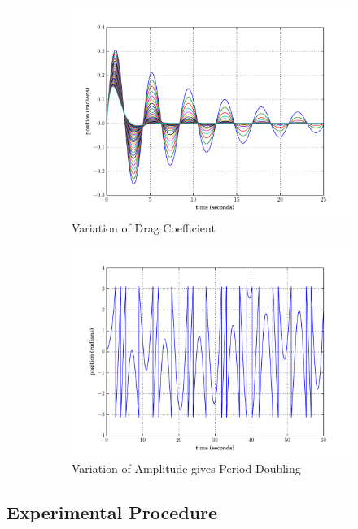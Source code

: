 \begin{figure}[!t]
	\captionsetup{width=0.8\textwidth}
	\begin{subfigure}[t]{.49\textwidth}
		\centering
		\includegraphics[width=\textwidth]{figures/plot02.pdf}
		\caption{Variation of Drag Coefficient}
		\label{fig:01A}
	\end{subfigure}
	\begin{subfigure}[t]{0.49\textwidth}
		\centering
		\includegraphics[width=\textwidth]{figures/plot03.pdf}
		\caption{Variation of Amplitude gives Period Doubling}
		\label{fig:02A}
	\end{subfigure}
	\caption{\blindtext}
	\label{fig:contour}
\end{figure}

\subsection{Experimental Procedure}
\blindtext[2]
